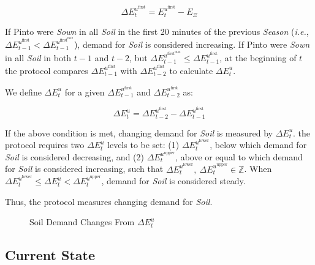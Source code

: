 \documentclass[tikz]{article}
\newcommand{\term}[1]{\textsl{#1}}
\begin{document}
    $$
        \Delta E_{t}^{u^{\text{first}}} = 
            E_{t}^{u^{\text{first}}} - E_{\Xi}
    $$

If Pinto were \term{Sown} in all \term{Soil} in the first 20 minutes of the previous \term{Season} (\textit{i.e.}, $\Delta E_{t-1}^{u^{\text{first}}} < \Delta E_{t-1}^{u^{\text{first}^{\text{max}}}}$), demand for \term{Soil} is considered increasing. If Pinto were \term{Sown} in all \term{Soil} in both $t-1$ and $t-2$, but $\Delta E_{t-1}^{u^{\text{first}^{\text{max}}}} \leq \Delta E_{t-1}^{u^{\text{first}}}$, at the beginning of $t$ the protocol compares $\Delta E_{t-1}^{u^{\text{first}}}$ with $\Delta E_{t-2}^{u^{\text{first}}}$ to calculate $\Delta E_{t}^{u}$.

We define $\Delta E_{t}^{u}$ for a given $\Delta E_{t-1}^{u^{\text{first}}}$ and $\Delta E_{t-2}^{u^{\text{first}}}$ as:

    $$
        \Delta E_{t}^{u} = 
            \Delta E_{t-2}^{u^{\text{first}}} - \Delta E_{t-1}^{u^{\text{first}}}
    $$

If the above condition is met, changing demand for \term{Soil} is measured by $\Delta E_{t}^{u}$. the protocol requires two $\Delta E_{t}^{u}$ levels to be set: (1) $\Delta E_{t}^{u^{\text{lower}}}$, below which demand for \term{Soil} is considered decreasing, and (2) $\Delta E_{t}^{u^{\text{upper}}}$, above or equal to which demand for \term{Soil} is considered increasing, such that $\Delta E_{t}^{u^{\text{lower}}},\ \Delta E_{t}^{u^{\text{upper}}} \in \mathbb{Z}$. When $\Delta E_{t}^{u^{\text{lower}}} \leq \Delta E_{t}^{u} < \Delta E_{t}^{u^{\text{upper}}}$, demand for \term{Soil} is considered steady.

Thus, the protocol measures changing demand for \term{Soil}.


\begin{figure}[h!]
    \centering
    
    \vspace*{-10.5mm} %
    \setlength{\belowcaptionskip}{-8pt} %
    \caption{Soil Demand Changes From $\Delta E_{t}^{u}$}
    \label{Soil Demand Changes From Time}
\end{figure}


\subsection{Current State}
\end{document}
